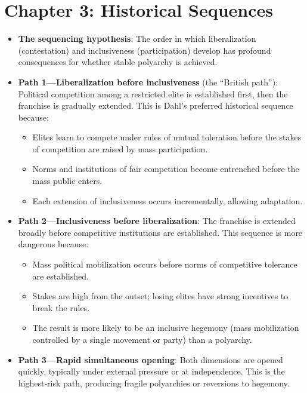 \documentclass[12pt]{article}
\begin{document}
\section{Chapter 3: Historical Sequences}

\begin{itemize}[leftmargin=*, itemsep=4pt]
    \item \textbf{The sequencing hypothesis}: The order in which liberalization (contestation) and inclusiveness (participation) develop has profound consequences for whether stable polyarchy is achieved.
    \item \textbf{Path 1---Liberalization before inclusiveness} (the ``British path''): Political competition among a restricted elite is established first, then the franchise is gradually extended. This is Dahl's preferred historical sequence because:
        \begin{itemize}
            \item Elites learn to compete under rules of mutual toleration before the stakes of competition are raised by mass participation.
            \item Norms and institutions of fair competition become entrenched before the mass public enters.
            \item Each extension of inclusiveness occurs incrementally, allowing adaptation.
        \end{itemize}
    \item \textbf{Path 2---Inclusiveness before liberalization}: The franchise is extended broadly before competitive institutions are established. This sequence is more dangerous because:
        \begin{itemize}
            \item Mass political mobilization occurs before norms of competitive tolerance are established.
            \item Stakes are high from the outset; losing elites have strong incentives to break the rules.
            \item The result is more likely to be an inclusive hegemony (mass mobilization controlled by a single movement or party) than a polyarchy.
        \end{itemize}
    \item \textbf{Path 3---Rapid simultaneous opening}: Both dimensions are opened quickly, typically under external pressure or at independence. This is the highest-risk path, producing fragile polyarchies or reversions to hegemony.

\end{itemize}
\end{document}
